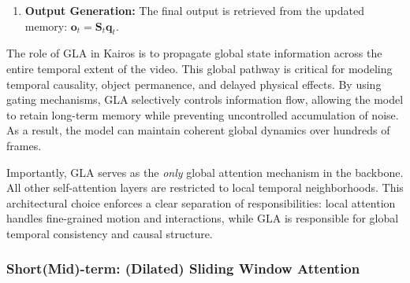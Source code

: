 \begin{enumerate}
Specifically, a decay gate $\alpha_t \in (0,1)$ is computed as:
\begin{equation}
\alpha_t = \sigma(\mathbf{W}_\alpha \mathbf{x}_t)
\end{equation}

The state update is then modified as:
\begin{equation}
\mathbf{S}_t =
\alpha_t \mathbf{S}_{t-1}
- \mathbf{v}_t^{\text{old}} \mathbf{k}_t^\top
+ \mathbf{v}_t^{\text{new}} \mathbf{k}_t^\top
\end{equation}

Equivalently, this can be written as:
\begin{equation}
\mathbf{S}_t =
\alpha_t \mathbf{S}_{t-1}
+ \beta_t (\mathbf{v}_t - \mathbf{v}_t^{\text{old}}) \mathbf{k}_t^\top
\end{equation}

Here, $\alpha_t$ acts as a forget gate that globally scales the previous memory state, enabling the model to discard outdated information more efficiently. Combined with the local delta correction term, this gated update provides both precise associative correction and adaptive long-term memory control.

\item \textbf{Output Generation:} The final output is retrieved from the updated memory: $\mathbf{o}_t = \mathbf{S}_t \mathbf{q}_t$.


\end{enumerate}

The role of GLA in Kairos is to propagate global state information across the entire temporal extent of the video. This global pathway is critical for modeling temporal causality, object permanence, and delayed physical effects. By using gating mechanisms, GLA selectively controls information flow, allowing the model to retain long-term memory while preventing uncontrolled accumulation of noise. As a result, the model can maintain coherent global dynamics over hundreds of frames.

Importantly, GLA serves as the \emph{only} global attention mechanism in the backbone. All other self-attention layers are restricted to local temporal neighborhoods. This architectural choice enforces a clear separation of responsibilities: local attention handles fine-grained motion and interactions, while GLA is responsible for global temporal consistency and causal structure.


\subsubsection{ Short(Mid)-term: (Dilated) Sliding Window Attention}

